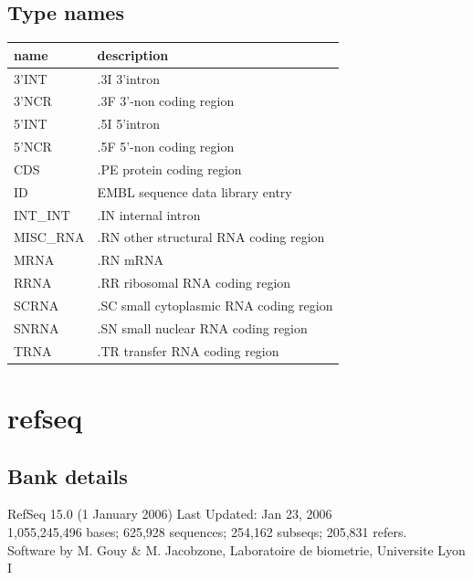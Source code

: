 \documentclass{article}
\begin{document}
\begin{Schunk}
\subsection{Type names}
\noindent\begin{tabular}{ll}
\hline \hline
name & description\\
\hline
3'INT & .3I 3'intron \\
3'NCR & .3F  3'-non coding region \\
5'INT & .5I 5'intron \\
5'NCR & .5F  5'-non coding region \\
CDS & .PE protein coding region \\
ID & EMBL sequence data library entry \\
INT\_INT & .IN  internal intron \\
MISC\_RNA & .RN other structural RNA coding region \\
MRNA & .RN mRNA \\
RRNA & .RR ribosomal RNA coding region \\
SCRNA & .SC small cytoplasmic RNA coding region \\
SNRNA & .SN small nuclear RNA coding region \\
TRNA & .TR transfer RNA coding region \\
\hline \hline
\end{tabular}

\section{ refseq }
\subsection{Bank details}
RefSeq 15.0 (1 January 2006) Last Updated: Jan 23, 2006\\
1,055,245,496 bases; 625,928 sequences; 254,162 subseqs; 205,831 refers.\\
Software by M. Gouy \& M. Jacobzone, Laboratoire de biometrie, Universite Lyon I


\end{Schunk}
\end{document}
